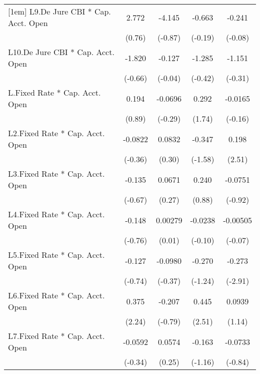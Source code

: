 {\begin{longtable}{l*{4}{c}}
[1em]
L9.De Jure CBI * Cap. Acct. Open&    2.772         &   -4.145         &   -0.663         &   -0.241         \\
                &   (0.76)         &  (-0.87)         &  (-0.19)         &  (-0.08)         \\
[1em]
L10.De Jure CBI * Cap. Acct. Open&   -1.820         &   -0.127         &   -1.285         &   -1.151         \\
                &  (-0.66)         &  (-0.04)         &  (-0.42)         &  (-0.31)         \\
[1em]
L.Fixed Rate * Cap. Acct. Open&    0.194         &  -0.0696         &    0.292         &  -0.0165         \\
                &   (0.89)         &  (-0.29)         &   (1.74)         &  (-0.16)         \\
[1em]
L2.Fixed Rate * Cap. Acct. Open&  -0.0822         &   0.0832         &   -0.347         &    0.198\sym{*}  \\
                &  (-0.36)         &   (0.30)         &  (-1.58)         &   (2.51)         \\
[1em]
L3.Fixed Rate * Cap. Acct. Open&   -0.135         &   0.0671         &    0.240         &  -0.0751         \\
                &  (-0.67)         &   (0.27)         &   (0.88)         &  (-0.92)         \\
[1em]
L4.Fixed Rate * Cap. Acct. Open&   -0.148         &  0.00279         &  -0.0238         & -0.00505         \\
                &  (-0.76)         &   (0.01)         &  (-0.10)         &  (-0.07)         \\
[1em]
L5.Fixed Rate * Cap. Acct. Open&   -0.127         &  -0.0980         &   -0.270         &   -0.273\sym{**} \\
                &  (-0.74)         &  (-0.37)         &  (-1.24)         &  (-2.91)         \\
[1em]
L6.Fixed Rate * Cap. Acct. Open&    0.375\sym{*}  &   -0.207         &    0.445\sym{*}  &   0.0939         \\
                &   (2.24)         &  (-0.79)         &   (2.51)         &   (1.14)         \\
[1em]
L7.Fixed Rate * Cap. Acct. Open&  -0.0592         &   0.0574         &   -0.163         &  -0.0733         \\
                &  (-0.34)         &   (0.25)         &  (-1.16)         &  (-0.84)         \\

\end{longtable}}
